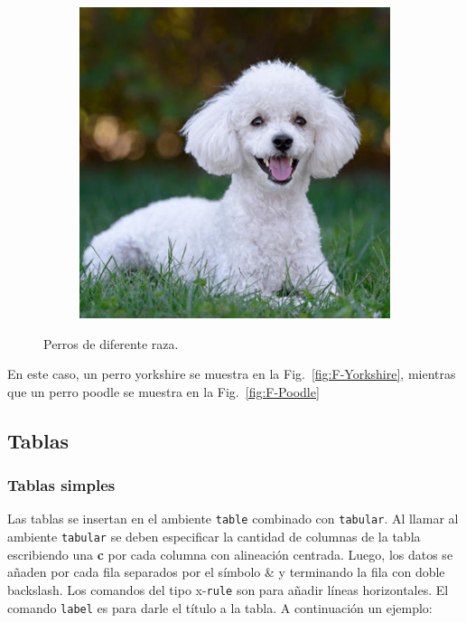 \documentclass[a4paper, titletoc, 12pt]{article}
\begin{document}
\begin{figure}[h]
\begin{subfigure}[t]{0.2575\textwidth}
{        \includegraphics[width=\textwidth]{F-Poodle.jpg}
        }%
    \end{subfigure}
    \caption{Perros de diferente raza.}\label{fig:Dos-Perros}
\end{figure}

En este caso, un perro yorkshire se muestra en la Fig.~\ref{fig:F-Yorkshire}, mientras que un perro poodle se muestra en la Fig.~\ref{fig:F-Poodle}

\subsection*{Tablas}
\subsubsection*{Tablas simples}
Las tablas se insertan en el ambiente \verb!table! combinado con \verb!tabular!. Al llamar al ambiente \verb!tabular! se deben especificar la cantidad de columnas de la tabla escribiendo una \textbf{c} por cada columna con alineación centrada. Luego, los datos se añaden por cada fila separados por el símbolo \& y terminando la fila con doble backslash. Los comandos del tipo x-\verb!rule! son para añadir líneas horizontales. El comando \verb!label! es para darle el título a la tabla. A continuación un ejemplo:
\end{document}
